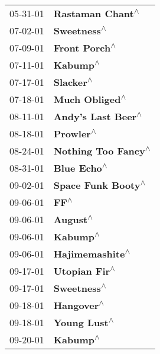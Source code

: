 \begin{supertabular}{p{0.25\columnwidth}p{0.75\columnwidth}}
 05-31-01 &                           \textbf{Rastaman Chant\textsuperscript{$\wedge$}} \\
 07-02-01 &                                \textbf{Sweetness\textsuperscript{$\wedge$}} \\
 07-09-01 &                              \textbf{Front Porch\textsuperscript{$\wedge$}} \\
 07-11-01 &                                   \textbf{Kabump\textsuperscript{$\wedge$}} \\
 07-17-01 &                                  \textbf{Slacker\textsuperscript{$\wedge$}} \\
 07-18-01 &                             \textbf{Much Obliged\textsuperscript{$\wedge$}} \\
 08-11-01 &                         \textbf{Andy's Last Beer\textsuperscript{$\wedge$}} \\
 08-18-01 &                                  \textbf{Prowler\textsuperscript{$\wedge$}} \\
 08-24-01 &                        \textbf{Nothing Too Fancy\textsuperscript{$\wedge$}} \\
 08-31-01 &                                \textbf{Blue Echo\textsuperscript{$\wedge$}} \\
 09-02-01 &                         \textbf{Space Funk Booty\textsuperscript{$\wedge$}} \\
 09-06-01 &                                       \textbf{FF\textsuperscript{$\wedge$}} \\
 09-06-01 &                                   \textbf{August\textsuperscript{$\wedge$}} \\
 09-06-01 &                                   \textbf{Kabump\textsuperscript{$\wedge$}} \\
 09-06-01 &                            \textbf{Hajimemashite\textsuperscript{$\wedge$}} \\
 09-17-01 &                              \textbf{Utopian Fir\textsuperscript{$\wedge$}} \\
 09-17-01 &                                \textbf{Sweetness\textsuperscript{$\wedge$}} \\
 09-18-01 &                                 \textbf{Hangover\textsuperscript{$\wedge$}} \\
 09-18-01 &                               \textbf{Young Lust\textsuperscript{$\wedge$}} \\
 09-20-01 &                                   \textbf{Kabump\textsuperscript{$\wedge$}} \\

\end{supertabular}

